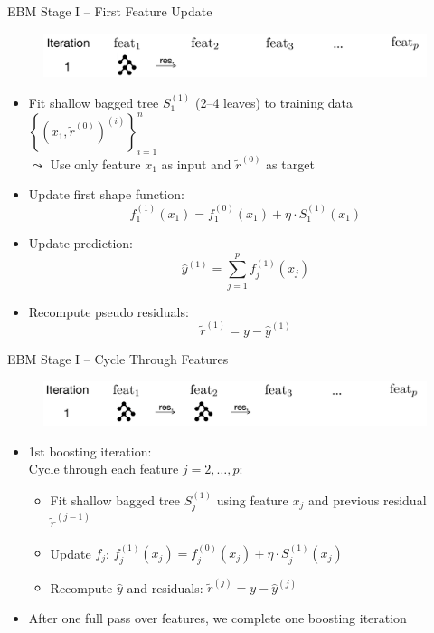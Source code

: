 \documentclass[11pt,compress,t,notes=noshow, aspectratio=169, xcolor=table]{beamer}
\begin{document}
\begin{frame}{EBM Stage I – First Feature Update}
\begin{figure}
    \centering
    \includegraphics[width=\linewidth]{figure/EBM_Step1.png}
\end{figure}
\begin{itemize}
    \item Fit shallow bagged tree $S_1^{(1)}$ (2–4 leaves) to training data $\left\{\left(x_1, \tilde{r}^{(0)}\right)^{(i)}\right\}_{i=1}^n$\\
    $\leadsto$ Use only feature $x_1$ as input and $\tilde{r}^{(0)}$ as target
    \item Update first shape function:
    $$
    f_1^{(1)}(x_1) = f_1^{(0)}(x_1) + \eta \cdot S_1^{(1)}(x_1)
    $$
    \item Update prediction:
    $$
    \hat{y}^{(1)} = \sum_{j=1}^p f_j^{(1)}(x_j)
    $$
    \item Recompute pseudo residuals:
    $$
    \tilde{r}^{(1)} = y - \hat{y}^{(1)}
    $$
\end{itemize}

\end{frame}


\begin{frame}{EBM Stage I – Cycle Through Features}
\begin{figure}
    \centering
    \includegraphics[width=\linewidth]{figure/EBM_Step2.png}
\end{figure}
\begin{itemize}
    \item 1st boosting iteration: \\
    Cycle through each feature $j = 2,\dots,p$:
    \begin{itemize}
        \item Fit shallow bagged tree $S_j^{(1)}$ using feature $x_j$ and previous residual $\tilde{r}^{(j-1)}$ %
        \item Update $f_j$: $f_j^{(1)}(x_j) = f_j^{(0)}(x_j) + \eta \cdot S_j^{(1)}(x_j)$
        \item Recompute $\hat{y}$ and residuals: $\tilde{r}^{(j)} = y - \hat{y}^{(j)}$
    \end{itemize}
    \item After one full pass over features, we complete one boosting iteration
\end{itemize}
\end{frame}
\end{document}
